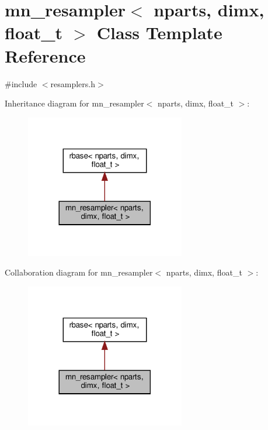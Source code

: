 \hypertarget{classmn__resampler}{}\section{mn\+\_\+resampler$<$ nparts, dimx, float\+\_\+t $>$ Class Template Reference}
\label{classmn__resampler}


{\ttfamily \#include $<$resamplers.\+h$>$}



Inheritance diagram for mn\+\_\+resampler$<$ nparts, dimx, float\+\_\+t $>$\+:
\nopagebreak
\begin{figure}[H]
\begin{center}
\leavevmode
\includegraphics[width=197pt]{classmn__resampler__inherit__graph}
\end{center}
\end{figure}


Collaboration diagram for mn\+\_\+resampler$<$ nparts, dimx, float\+\_\+t $>$\+:
\nopagebreak
\begin{figure}[H]
\begin{center}
\leavevmode
\includegraphics[width=197pt]{classmn__resampler__coll__graph}
\end{center}
\end{figure}
